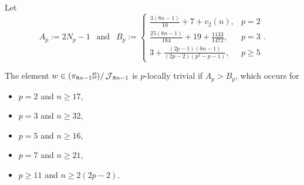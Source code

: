 \begin{ntn}
  Let
  $$ A_p := 2N_p - 1\ \ \text{ and }\ \ B_p := \begin{cases} \frac{3(8n-1)}{10} + 7 + v_2(n), & p=2 \\ \frac{25(8n-1)}{184} + 19 + \frac{1133}{1472}, & p=3 \\ 3 + \frac{(2p-1)(8n-1)}{(2p-2)(p^2 - p - 1)}, & p \geq 5 \end{cases}. $$
\end{ntn}

\begin{lem} \label{lem:logs}
  The element $w \in (\pi_{8n-1} \mathbb{S}) / \operatorname{\mathcal{J}}_{8n-1}$ is $p$-locally trivial if $A_p > B_p$,
  which occurs for 
  \begin{itemize}
  \item $p=2$ and $n \geq 17$,
  \item $p=3$ and $n \geq 32$,
  \item $p=5$ and $n \geq 16$,
  \item $p=7$ and $n \geq 21$,
  \item $p \ge 11$ and $n \geq 2(2p-2)$.
  \end{itemize}
\end{lem}

